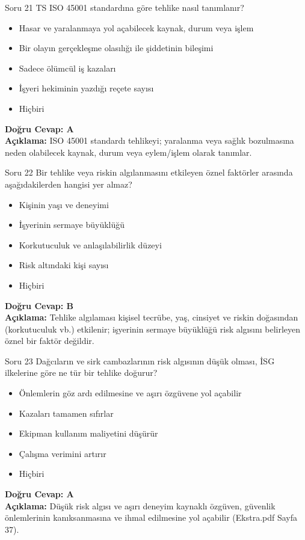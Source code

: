 \documentclass[12pt,a4paper]{article}
\begin{document}
\begin{testcard}{Soru 21}
    TS ISO 45001 standardına göre tehlike nasıl tanımlanır?
    \begin{itemize}
        \item[A)] Hasar ve yaralanmaya yol açabilecek kaynak, durum veya işlem
        \item[B)] Bir olayın gerçekleşme olasılığı ile şiddetinin bileşimi
        \item[C)] Sadece ölümcül iş kazaları
        \item[D)] İşyeri hekiminin yazdığı reçete sayısı
        \item[E)] Hiçbiri
    \end{itemize}
    \tcblower
    \textbf{Doğru Cevap: A} \\
    \textbf{Açıklama:} ISO 45001 standardı tehlikeyi; yaralanma veya sağlık bozulmasına neden olabilecek kaynak, durum veya eylem/işlem olarak tanımlar.
\end{testcard}

\begin{testcard}{Soru 22}
    Bir tehlike veya riskin algılanmasını etkileyen öznel faktörler arasında aşağıdakilerden hangisi yer almaz?
    \begin{itemize}
        \item[A)] Kişinin yaşı ve deneyimi
        \item[B)] İşyerinin sermaye büyüklüğü
        \item[C)] Korkutuculuk ve anlaşılabilirlik düzeyi
        \item[D)] Risk altındaki kişi sayısı
        \item[E)] Hiçbiri
    \end{itemize}
    \tcblower
    \textbf{Doğru Cevap: B} \\
    \textbf{Açıklama:} Tehlike algılaması kişisel tecrübe, yaş, cinsiyet ve riskin doğasından (korkutuculuk vb.) etkilenir; işyerinin sermaye büyüklüğü risk algısını belirleyen öznel bir faktör değildir.
\end{testcard}

\begin{testcard}{Soru 23}
    Dağcıların ve sirk cambazlarının risk algısının düşük olması, İSG ilkelerine göre ne tür bir tehlike doğurur?
    \begin{itemize}
        \item[A)] Önlemlerin göz ardı edilmesine ve aşırı özgüvene yol açabilir
        \item[B)] Kazaları tamamen sıfırlar
        \item[C)] Ekipman kullanım maliyetini düşürür
        \item[D)] Çalışma verimini artırır
        \item[E)] Hiçbiri
    \end{itemize}
    \tcblower
    \textbf{Doğru Cevap: A} \\
    \textbf{Açıklama:} Düşük risk algısı ve aşırı deneyim kaynaklı özgüven, güvenlik önlemlerinin kanıksanmasına ve ihmal edilmesine yol açabilir (Ekstra.pdf Sayfa 37).
\end{testcard}
\end{document}
